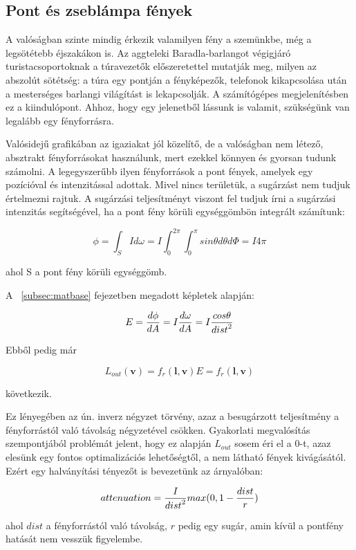 \subsection{Pont és zseblámpa fények}

A valóságban szinte mindig érkezik valamilyen fény a szemünkbe, még a legsötétebb éjszakákon is. Az aggteleki Baradla-barlangot végigjáró turistacsoportoknak a túravezetők előszeretettel mutatják meg, milyen az abszolút sötétség: a túra egy pontján a fényképezők, telefonok kikapcsolása után a mesterséges barlangi világítást is lekapcsolják. A számítógépes megjelenítésben ez a kiindulópont. Ahhoz, hogy egy jelenetből lássunk is valamit, szükségünk van legalább egy fényforrásra.

Valósidejű grafikában az igaziakat jól közelítő, de a valóságban nem létező, absztrakt fényforrásokat használunk, mert ezekkel könnyen és gyorsan tudunk számolni. A legegyszerűbb ilyen fényforrások a pont fények, amelyek egy pozícióval és intenzitással adottak. Mivel nincs területük, a sugárzást nem tudjuk értelmezni rajtuk. A sugárzási teljesítményt viszont fel tudjuk írni a sugárzási intenzitás segítségével, ha a pont fény körüli egységgömbön integrált számítunk:

\[
\phi = \int_S { I d\omega } = I \int_0^{2\pi} { \int_0^\pi { sin\theta d\theta d\Phi } } = I 4\pi
\]

ahol S a pont fény körüli egységgömb.

\vspace{12pt}
\noindent
A ~\ref{subsec:matbase} fejezetben megadott képletek alapján:

\[
E = { { d\phi } \over { dA } } = I { { d\omega } \over { dA } } = I { { cos\theta } \over { dist }^2 }
\]

\noindent
Ebből pedig már

\[
L_{out}(\mathbf{v}) = f_r(\mathbf{l}, \mathbf{v}) E = f_r(\mathbf{l}, \mathbf{v}) {}
\]

következik.

Ez lényegében az ún. inverz négyzet törvény, azaz a besugárzott teljesítmény a fényforrástól való távolság négyzetével csökken. Gyakorlati megvalósítás szempontjából problémát jelent, hogy ez alapján \(L_{out}\) sosem éri el a 0-t, azaz elesünk egy fontos optimalizációs lehetőségtől, a nem látható fények kivágásától. Ezért egy halványítási tényezőt is bevezetünk az árnyalóban:

\[
attenuation = { I \over {dist}^2 } max(0, 1 - { dist \over r })
\]

ahol \(dist\) a fényforrástól való távolság, \(r\) pedig egy sugár, amin kívül a pontfény hatását nem vesszük figyelembe.

